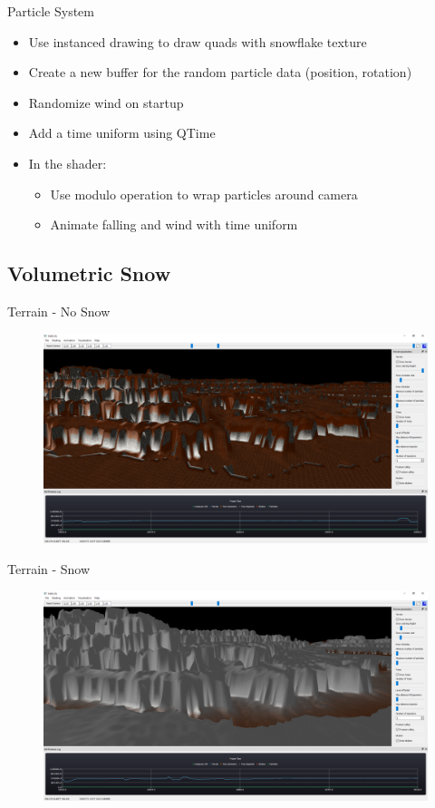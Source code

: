 \documentclass[18pt]{beamer}
\begin{document}
\begin{frame}{Particle System}
\begin{itemize}
\item Use instanced drawing to draw quads with snowflake texture
\item Create a new buffer for the random particle data (position, rotation)
\item Randomize wind on startup
\item Add a time uniform using QTime
\item In the shader:
\begin{itemize}
	\item Use modulo operation to wrap particles around camera
	\item Animate falling and wind with time uniform
\end{itemize}

\end{itemize}
\end{frame}

\subsection{Volumetric Snow}

\begin{frame}{Terrain - No Snow}
	\begin{figure}[H]
		\centering
		\includegraphics[width=15cm]{images/Terrain-nosnow.PNG}
	\end{figure}
\end{frame}
\begin{frame}{Terrain - Snow}
	\begin{figure}[H]
		\centering
		\includegraphics[width=15cm]{images/Terrain-Snow.PNG}
	\end{figure}
\end{frame}
\end{document}
